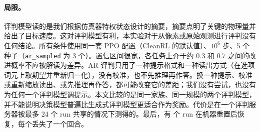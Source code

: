 \paragraph{局限。} 评判模型读的是我们根据仿真器特权状态设计的摘要，摘要点明了关键的物理量并给出了目标速度。这对评判模型有利，本实验对于从像素或原始观测进行评判没有任何结论。所有条件使用同一套 PPO 配置（CleanRL 的默认值）、$10^6$ 步、5 个种子（\texttt{ar\_sampled} 为 3 个）。置信区间很宽，各任务上介于约 0.3 和 0.7 之间的改进概率不应被解读为差异。AR 评判只用了一种提示格式和一种读出方式（在选项词元上取期望并重新归一化），没有校准，也不先推理再作答。换一种提示、校准或重新缩放读出、或先推理再作答，都可能改变它的差距；我们没有尝试，也没有为任何一个评判模型调提示。本文比较的是同一家族、同一规模的两个评判模型，并不能说明决策模型普遍比生成式评判模型更适合作为奖励。代价是在一个评判服务器被最多 24 个 run 共享的情况下测得的。最后，有  个 run 在机器重置后恢复，每个丢失了一个回合。
